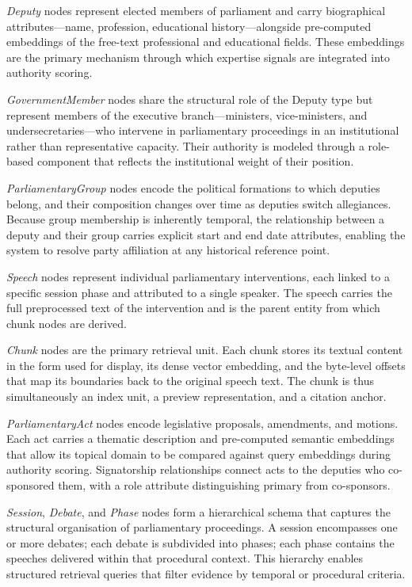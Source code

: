 \textit{Deputy} nodes represent elected members of parliament and carry biographical
attributes---name, profession, educational history---alongside pre-computed embeddings of
the free-text professional and educational fields. These embeddings are the primary
mechanism through which expertise signals are integrated into authority scoring.

\textit{GovernmentMember} nodes share the structural role of the Deputy type but represent
members of the executive branch---ministers, vice-ministers, and undersecretaries---who
intervene in parliamentary proceedings in an institutional rather than representative
capacity. Their authority is modeled through a role-based component that reflects the
institutional weight of their position.

\textit{ParliamentaryGroup} nodes encode the political formations to which deputies belong,
and their composition changes over time as deputies switch allegiances. Because group
membership is inherently temporal, the relationship between a deputy and their group
carries explicit start and end date attributes, enabling the system to resolve party
affiliation at any historical reference point.

\textit{Speech} nodes represent individual parliamentary interventions, each linked to a
specific session phase and attributed to a single speaker. The speech carries the full
preprocessed text of the intervention and is the parent entity from which chunk nodes are
derived.

\textit{Chunk} nodes are the primary retrieval unit. Each chunk stores its textual content
in the form used for display, its dense vector embedding, and the byte-level offsets that
map its boundaries back to the original speech text. The chunk is thus simultaneously an
index unit, a preview representation, and a citation anchor.

\textit{ParliamentaryAct} nodes encode legislative proposals, amendments, and motions.
Each act carries a thematic description and pre-computed semantic embeddings that allow
its topical domain to be compared against query embeddings during authority scoring.
Signatorship relationships connect acts to the deputies who co-sponsored them, with a
role attribute distinguishing primary from co-sponsors.

\textit{Session}, \textit{Debate}, and \textit{Phase} nodes form a hierarchical schema
that captures the structural organisation of parliamentary proceedings. A session
encompasses one or more debates; each debate is subdivided into phases; each phase
contains the speeches delivered within that procedural context. This hierarchy enables
structured retrieval queries that filter evidence by temporal or procedural criteria.

